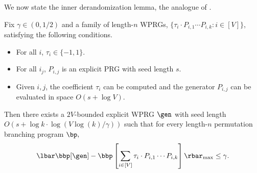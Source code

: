 We now state the inner derandomization lemma, the analogue of .
\begin{lemma}\label{lem:cycleInner}
Fix $\gamma\in(0,1/2)$ and a family of length-$n$ WPRGs, %
%
 $\{\tau_i\cdot  P_{i,1}\cdots P_{i,k}:i\in [V]\}$, satisfying the following 
%
conditions.  %
\begin{itemize}
    \item For all $i$, $\tau_i\in \{-1,1\}$.
    \item For all $i_j$, $P_{i,j}$ is an explicit PRG with seed length $s$.
    \item Given $i,j$, the coefficient $\tau_i$ can be computed and the generator $P_{i,j}$ can be evaluated in space $O(s+\log V)$.
\end{itemize}
Then there exists a $2V$-bounded explicit WPRG $\gen$ with seed length $O(s+ \log k\cdot \log(V\log(k)/\gamma))$ such that for every length-$n$ permutation branching program $\bp,$
$$\lbar\bbp[\gen]- \bbp\left[\sum_{i\in[V]}\tau_i \cdot P_{i,1}\cdots P_{i,k}\right]\rbar_{\max} \leq \gamma.$$
\end{lemma}

